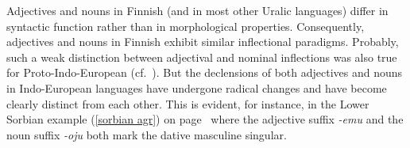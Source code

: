 Adjectives and nouns in Finnish (and in most other Uralic languages) differ in syntactic function rather than in morphological properties. Consequently, adjectives and nouns in Finnish exhibit similar inflectional paradigms. Probably, such a weak distinction between adjectival and nominal inflections was also true for Proto\hyp{}Indo-European (cf.~\citealt[80]{comrie1998}). But the declensions of both adjectives and nouns in Indo-European languages have undergone radical changes and have become clearly distinct from each other. This is evident, for instance, in the Lower Sorbian example (\ref{sorbian agr}) on page~\pageref{sorbian agr} where the adjective suffix \textit{-emu} and the noun suffix \textit{-oju} both mark the dative masculine singular.

